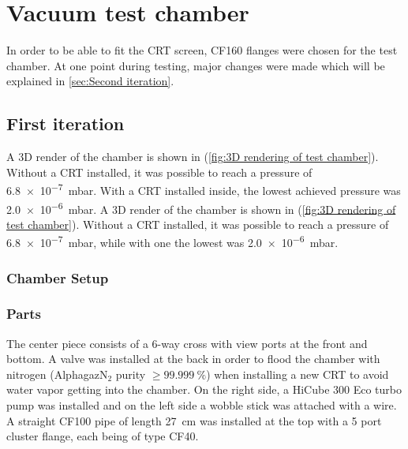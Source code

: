 
\chapter{Vacuum test chamber}
\label{ch:Vacuum chamber}

In order to be able to fit the CRT screen, CF160 flanges were chosen for the test chamber. At one point during testing, major changes were made which will be explained in \cref{sec:Second iteration}.

\section{First iteration}
\label{sec:vacuum chamber first iteration}

A 3D render of the chamber is shown in  (\cref{fig:3D rendering of test chamber}). Without a CRT installed, it was possible to reach a pressure of \SI{6.8e-7}{\milli\bar}. With a CRT installed inside, the lowest achieved pressure was \SI{2.0e-6}{\milli\bar}.
A 3D render of the chamber is shown in  (\cref{fig:3D rendering of test chamber}). Without a CRT installed, it was possible to reach a pressure of \SI{6.8e-7}{\milli\bar}, while with one the lowest was \SI{2.0e-6}{\milli\bar}. 
 
\subsection{Chamber Setup}
\subsection{Parts} 
\label{subsec:Chamber Setup}
 
The center piece consists of a 6-way cross with view ports at the front and bottom. A valve was installed at the back in order to flood the chamber with nitrogen  (Alphagaz\texttrademark N$_2$ purity $\ge\SI{99.999}{\percent}$) when installing a new CRT to avoid water vapor getting into the chamber. On the right side, a HiCube 300 Eco turbo pump was installed and on the left side a wobble stick was attached with a wire. A straight CF100 pipe of length \SI{27}{\centi\meter} was installed at the top with a 5 port cluster flange, each being of type CF40.

